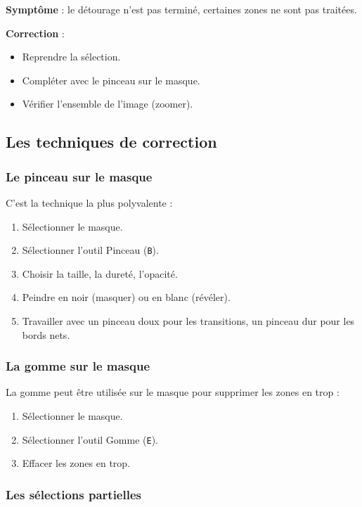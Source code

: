 \textbf{Symptôme} : le détourage n'est pas terminé, certaines zones ne sont pas traitées.

\textbf{Correction} :
\begin{itemize}
    \item Reprendre la sélection.
    \item Compléter avec le pinceau sur le masque.
    \item Vérifier l'ensemble de l'image (zoomer).
\end{itemize}

\subsection{Les techniques de correction}

\subsubsection{Le pinceau sur le masque}

C'est la technique la plus polyvalente :

\begin{enumerate}
    \item Sélectionner le masque.
    \item Sélectionner l'outil Pinceau (\texttt{B}).
    \item Choisir la taille, la dureté, l'opacité.
    \item Peindre en noir (masquer) ou en blanc (révéler).
    \item Travailler avec un pinceau doux pour les transitions, un pinceau dur pour les bords nets.
\end{enumerate}

\subsubsection{La gomme sur le masque}

La gomme peut être utilisée sur le masque pour supprimer les zones en trop :

\begin{enumerate}
    \item Sélectionner le masque.
    \item Sélectionner l'outil Gomme (\texttt{E}).
    \item Effacer les zones en trop.
\end{enumerate}

\subsubsection{Les sélections partielles}

